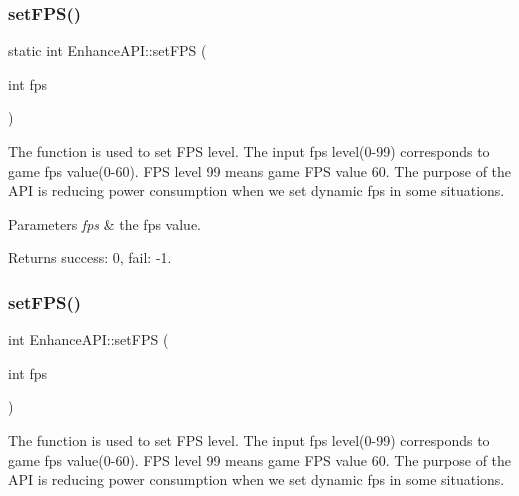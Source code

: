 \subsubsection{\texorpdfstring{set\+F\+P\+S()}{setFPS()}\hspace{0.1cm}{\footnotesize\ttfamily [1/2]}}
{\footnotesize\ttfamily static int Enhance\+A\+P\+I\+::set\+F\+PS (\begin{DoxyParamCaption}\item[{int}]{fps }\end{DoxyParamCaption})\hspace{0.3cm}{\ttfamily [static]}}



The function is used to set F\+PS level.  The input fps level(0-\/99) corresponds to game fps value(0-\/60). F\+PS level 99 means game F\+PS value 60. The purpose of the A\+PI is reducing power consumption when we set dynamic fps in some situations. 


\begin{DoxyParams}{Parameters}
{\em fps} & the fps value. \\
\hline
\end{DoxyParams}
\begin{DoxyReturn}{Returns}
success\+: 0, fail\+: -\/1. 
\end{DoxyReturn}
\mbox{\label{classEnhanceAPI_a07e1cdf5ec67fd23763eb40ec4153383}} 
\subsubsection{\texorpdfstring{set\+F\+P\+S()}{setFPS()}\hspace{0.1cm}{\footnotesize\ttfamily [2/2]}}
{\footnotesize\ttfamily int Enhance\+A\+P\+I\+::set\+F\+PS (\begin{DoxyParamCaption}\item[{int}]{fps }\end{DoxyParamCaption})\hspace{0.3cm}{\ttfamily [static]}}



The function is used to set F\+PS level.  The input fps level(0-\/99) corresponds to game fps value(0-\/60). F\+PS level 99 means game F\+PS value 60. The purpose of the A\+PI is reducing power consumption when we set dynamic fps in some situations. 


